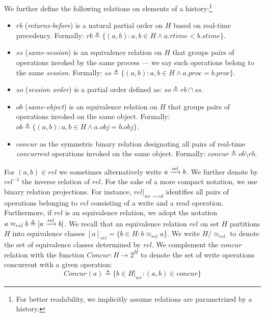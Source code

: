 \documentclass[letter, 11pt]{article}
\begin{document}
We further define the following relations on elements of a history:\footnote{For better readability, we implicitly assume relations are parametrized by a history.}  
\begin{itemize}
\item $rb$ (\emph{returns-before}) is a natural partial order on $H$ based on real-time precedency.
Formally: $rb \triangleq \{ (a, b) :  a, b \in H \wedge a.rtime < b.stime \}$.
\item $ss$ (\emph{same-session}) is an equivalence relation on $H$ that groups pairs of operations invoked by the same process --- we say such operations belong to the same \emph{session}. Formally: $ss \triangleq \{ (a, b) :  a, b \in H \wedge a.proc = b.proc \}$.
\item  $so$ (\emph{session order}) is a partial order defined as: $so \triangleq rb \cap ss$.
\item $ob$ (\emph{same-object}) is an equivalence relation on $H$ that groups pairs of operations invoked on the same object.
Formally: $ob \triangleq \{ (a, b) :  a, b \in H \wedge a.obj = b.obj \}$.
\item  $\mathit{concur}$ as the symmetric binary relation designating all pairs of real-time \emph{concurrent} operations invoked on the same object. Formally: 
$
concur \triangleq ob \setminus rb
$.
\end{itemize} 
For $(a,b)\in rel$ we sometimes alternatively write $a \xrightarrow[]{\text{\textit{rel}}} b$. We further denote by $rel^{-1}$ the inverse relation of $rel$. For the sake of a more compact notation, we use binary relation projections.
For instance, $rel|_{wr \rightarrow rd}$ identifies all pairs of operations belonging to $rel$ 
consisting of a write and a read operation.
Furthermore, if $rel$ is an equivalence relation, we adopt the notation
$a \approx_{rel} b \triangleq [a \xrightarrow[]{\text{\textit{rel}}} b]$.
We recall that an equivalence relation $rel$ on set $H$ partitions $H$ into equivalence classes
$[a]_{rel} = \{b \in H : b \approx_{rel} a\}$. We write $H/\approx_{rel}$ to denote the set of equivalence classes determined by $rel$. 
We complement the $concur$ relation  with the function $\mathit{Concur}: H\rightarrow 2^H$ to denote the set of write operations concurrent with a given operation:
\begin{equation}
\mathit{Concur(a)} \triangleq \{b \in H|_{wr}: (a,b)\in \mathit{concur}\}
\end{equation}
\end{document}
